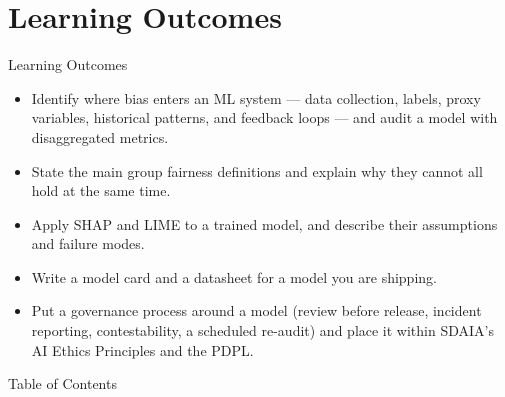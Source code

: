 \section{Learning Outcomes}

\begin{frame}{Learning Outcomes}
    \begin{itemize}
        \setlength\itemsep{0.7em}
        \item Identify where bias enters an ML system --- data collection, labels, proxy variables, historical patterns, and feedback loops --- and audit a model with disaggregated metrics.

        \item State the main group fairness definitions and explain why they cannot all hold at the same time.

        \item Apply SHAP and LIME to a trained model, and describe their assumptions and failure modes.

        \item Write a model card and a datasheet for a model you are shipping.

        \item Put a governance process around a model (review before release, incident reporting, contestability, a scheduled re-audit) and place it within SDAIA's AI Ethics Principles and the PDPL.
    \end{itemize}
\end{frame}

\begin{frame}[allowframebreaks]{Table of Contents}
    \tableofcontents
\end{frame}
